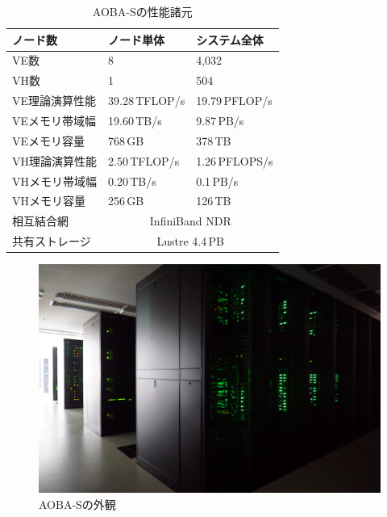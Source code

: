 ﻿\documentclass[submit,techrep,noauthor]{ipsj}
\begin{document}
\begin{table}
\centering
\caption{AOBA-Sの性能諸元}\label{tbl:aoba-s}
\begin{tabular}{@{}lll@{}}
\toprule
ノード数        & ノード単体     & システム全体           \\ \midrule
VE数            & 8              & 4,032                  \\ \midrule
VH数            & 1              & 504                    \\
VE理論演算性能  & 39.28\,TFLOP/s & 19.79\,PFLOP/s         \\
VEメモリ帯域幅  & 19.60\,TB/s    & 9.87\,PB/s             \\
VEメモリ容量    & 768\,GB        & 378\,TB                \\ \midrule
VH理論演算性能  & 2.50\,TFLOP/s  & 1.26\,PFLOPS/s         \\
VHメモリ帯域幅  & 0.20\,TB/s     & 0.1\,PB/s              \\
VHメモリ容量    & 256\,GB        & 126\,TB                \\ \midrule
相互結合網      & \multicolumn{2}{c}{InfiniBand NDR}      \\
共有ストレージ  & \multicolumn{2}{c}{Lustre 4.4\,PB}      \\ \bottomrule
\end{tabular}
\end{table}

\begin{figure}
  \centering
  \includegraphics[width=.9\columnwidth]{figs/rack.jpg}
  \caption{AOBA-Sの外観}\label{fig:rack}
\end{figure}
\end{document}
